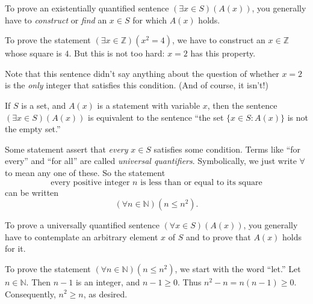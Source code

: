 \documentclass[11pt,dvipsnames]{book}
\numberwithin{figure}{section} %
\numberwithin{table}{section} %
\begin{document}
To prove an existentially quantified sentence $(\exists x\in S)(A(x))$, you generally have to \emph{construct} or \emph{find} an $x\in S$ for which $A(x)$ holds.
\begin{example}
    To prove the statement $(\exists x\in\mathbb{Z})(x^2=4)$, we have to construct an $x \in \mathbb{Z}
    $ whose square is $4$.
    But this is not too hard: $x = 2$ has this property.
    
    Note that this sentence didn't say anything about the question of whether $x=2$ is the \emph{only} integer that satisfies this condition.
    (And of course, it isn't!)
\end{example}

If $S$ is a set, and $A(x)$ is a statement with variable $x$, then the sentence $(\exists x \in S)(A(x))$ is equivalent to the sentence ``the set $\{x \in S : A(x)\}$ is not the empty set.''

Some statement assert that \emph{every} $x \in S$ satisfies some condition.
Terms like ``for every'' and ``for all'' are called \emph{universal quantifiers}.
Symbolically, we just write $\forall$ to mean any one of these.
So the statement
\[
\text{every positive integer $n$ is less than or equal to its square}
\]
can be written
\[
(\forall n\in\mathbb{N})(n\leq n^2).
\]

To prove a universally quantified sentence $(\forall x \in S)(A(x))$, you generally have to contemplate an arbitrary element $x$ of $S$ and to prove that $A(x)$ holds for it.
\begin{example}
    To prove the statement $(\forall n \in \mathbb{N})(n \leq n^2)$, we start with the word ``let.''
    Let $n \in \mathbb{N}$.
    Then $n-1$ is an integer, and $n-1\geq 0$.
    Thus $n^2-n = n(n-1) \geq 0$.
    Consequently, $n^2 \geq n$, as desired.
\end{example}
\end{document}
